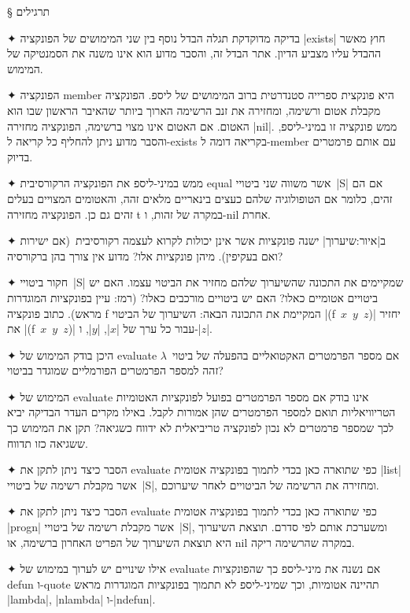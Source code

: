 § תרגילים
\begin{enumerate}
  ✦ בדיקה מדוקדקת תגלה הבדל נוסף בין שני המימושים של הפונקציה \E|exists| חוץ
  מאשר ההבדל עליו מצביע הדיון. אתר הבדל זה, והסבר מדוע הוא אינו משנה את
  הסמנטיקה של המימוש.

  ✦ הפונקציה member היא פונקצית ספרייה סטנדרטית ברוב המימושים של ליספ. הפונקציה
  מקבלת אטום ורשימה, ומחזירה את זנב הרשימה הארוך ביותר שהאיבר הראשון שבו הוא
  האטום. אם האטום אינו מצוי ברשימה, הפונקציה מחזירה \E|nil|. ממש פונקציה זו
  במיני-ליספ, והסבר מדוע ניתן להחליף כל קריאה ל-exists בקריאה דומה
  ל-member עם אותם פרמטרים בדיוק.

  ✦ ממש במיני-ליספ את הפונקציה הרקורסיבית equal אשר משווה שני ביטויי~\E|S| אם
  הם זהים, כלומר אם הטופולוגיה שלהם כעצים בינאריים מלאים זהה, והאטומים המצויים
  בעלים זהים גם כן. הפונקציה מחזירה t במקרה של זהות, ו-nil אחרת.

  ✦ ב|איור:שיערוך| ישנה פונקציות אשר אינן יכולות לקרוא לעצמה רקורסיבית~(אם
  ישירות ואם בעקיפין). מיהן פונקציות אלו? מדוע אין צורך בהן ברקורסיה?

  ✦ חקור ביטויי~\E|S| שמקיימים את התכונה שהשיערוך שלהם מחזיר את הביטוי עצמו. האם
  יש ביטויים אטומיים כאלו? האם יש ביטויים מורכבים כאלו? (רמז: עיין בפונקציות
  המוגדרות מראש). כתוב פונקציה f המקיימת את התכונה הבאה: השיערוך של הביטוי
  \E|(f~$x$~$y$~$z$)| יחזיר את \E|(f~$x$~$y$~$z$)| עבור כל ערך של \E|$x$|,
  \E|$y$|, ו-\E|$z$|.

  ✦ היכן בודק המימוש של evaluate אם מספר הפרמטרים האקטואליים בהפעלה של
  ביטוי~$λ$ זהה למספר הפרמטרים הפורמליים שמוגדר בביטוי?

  ✦ המימוש של evaluate אינו בודק אם מספר הפרמטרים בפועל לפונקציות האטומיות
  הטריוויאליות תואם למספר הפרמטרים שהן אמורות לקבל. באילו מקרים העדר הבדיקה יביא
  לכך שמספר פרמטרים לא נכון לפונקציה טריביאלית לא ידווח כשגיאה? תקן את המימוש
  כך ששגיאה כזו תדווח.

  ✦ הסבר כיצד ניתן לתקן את evaluate כפי שתוארה כאן בכדי לתמוך בפונקציה אטומית
  \E|list| אשר מקבלת רשימה של ביטויי~\E|S|, ומחזירה את הרשימה של הביטויים לאחר
  שיערוכם.

  ✦ הסבר כיצד ניתן לתקן את evaluate כפי שתוארה כאן בכדי לתמוך בפונקציה אטומית
  \E|progn| אשר מקבלת רשימה של ביטויי~\E|S|, ומשערכת אותם לפי סדרם. תוצאת
  השיערוך היא תוצאת השיערוך של הפריט האחרון ברשימה, או nil במקרה שהרשימה ריקה.

  ✦ אילו שינויים יש לערוך במימוש של evaluate אם נשנה את מיני-ליספ כך שהפונקציות
  defun ו-quote תהיינה אטומיות, וכך שמיני-ליספ לא תתמוך בפונקציות המוגדרות
  מראש \E|lambda|, \E|nlambda| ו-\E|ndefun|.


\end{enumerate}
